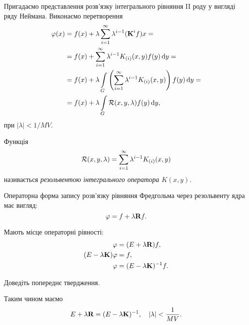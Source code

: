 Пригадаємо представлення розв'язку інтегрального рівняння II роду у вигляді ряду Неймана. Виконаємо перетворення
\begin{equation}
	\begin{aligned}
		\phi(x) &= f(x) + \lambda \Sum_{i = 1}^\infty \lambda^{i - 1} (\bf{K}^i f) x = \\
		&= f(x) + \Sum_{i = 1}^\infty \lambda^{i - 1} K_{(i)} (x, y) f(y) \diff y = \\
		&= f(x) + \lambda \Int_G \left( \Sum_{i = 1}^\infty \lambda^{i - 1} K_{(i)} (x, y) \right) f(y) \diff y = \\
		&= f(x) + \lambda \Int_G \mathcal{R}(x, y, \lambda) f(y) \diff y,
	\end{aligned}
\end{equation}
при $|\lambda| < 1 / MV$.

\begin{definition}
	Функція
	\begin{equation}
		\cal{R}(x, y, \lambda) = \Sum_{i = 1}^\infty \lambda^{i - 1} K_{(i)} (x, y)
	\end{equation}
	називається \it{резольвентою} інтегрального оператора $K(x, y)$.
\end{definition}

\begin{remark}
    Операторна форма запису розв'язку рівняння Фредгольма через резольвенту ядра має вигляд:
    \begin{equation}
    	\phi = f + \lambda \bf{R} f.
    \end{equation}
\end{remark}

\begin{proposition}
	\label{proposition:2.1.17}
	Мають місце операторні рівності:
	\begin{align}
		\phi &= (E + \lambda \bf{R})f, \\
		(E - \lambda \bf{K})\phi &= f, \\
		\phi &= (E - \lambda \bf{K})^{-1}f.
	\end{align}
\end{proposition}

\begin{exercise}
	Доведіть попереднє твердження.
\end{exercise}

Таким чином маємо
\begin{equation}
	E + \lambda \bf{R} = (E - \lambda \bf{K})^{-1}, \quad |\lambda| < \dfrac{1}{MV}.
\end{equation}

